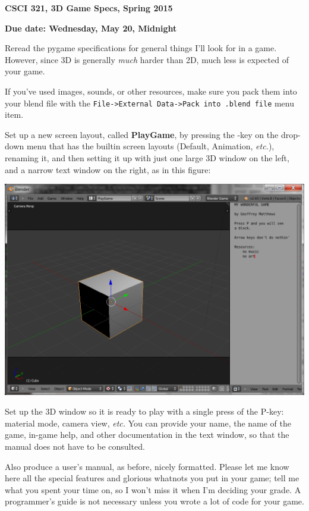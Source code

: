 \documentclass{article}
\begin{document}
\centerline{\bf CSCI 321, 3D Game Specs, Spring 2015}

{\bf Due date: Wednesday, May 20, Midnight}

Reread the pygame specifications for general things I'll look for in
a game.  However, since 3D is generally {\em much} harder than 2D,
much less is expected of your game.  

If you've used images, sounds, or other resources, make sure you pack
them into your blend file with the
\verb+File->External Data->Pack into .blend file+ menu item.

Set up a new screen layout, called {\bf PlayGame}, by pressing the
\fbox{+}-key on the drop-down menu that has the builtin screen layouts
(Default, Animation, {\em etc.}), renaming it, and then setting it up
with just one large 3D window on the left, and a narrow text window on
the right, as in this figure:

\includegraphics[width=\textwidth]{screenlayout.png}

Set up the 3D window so it is ready to play with a single press of the
P-key: material mode, camera view, {\em etc.}  You can provide your
name, the name of the game, in-game help, and other documentation in
the text window, so that the manual does not have to be consulted.

Also produce a user's manual, as before, nicely formatted.
Please let me know here all the special features
and glorious whatnots you put in your game; tell me what you spent
your time on, so I won't miss it when I'm deciding your grade.
A programmer's guide is not necessary unless you wrote a lot of code
for your game. 
\end{document}
